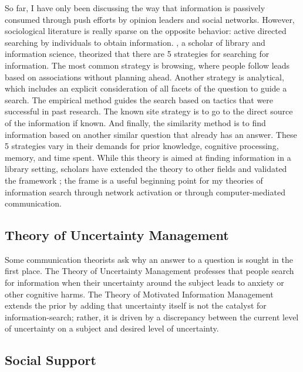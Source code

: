 So far, I have only been discussing the way that information is
passively consumed through push efforts by opinion leaders and social
networks. However, sociological literature is really sparse on the
opposite behavior: active directed searching by individuals to obtain
information. \citep{pejtersenDesignComputeraidedUsersystem1984}, a scholar of library and information
science, theorized that there are 5 strategies for searching for
information. The most common strategy is browsing, where people follow
leads based on associations without planning ahead. Another strategy is
analytical, which includes an explicit consideration of all facets of
the question to guide a search. The empirical method guides the search
based on tactics that were successful in past research. The known site
strategy is to go to the direct source of the information if known. And
finally, the similarity method is to find information based on another
similar question that already has an answer. These 5 strategies vary in
their demands for prior knowledge, cognitive processing, memory, and
time spent. While this theory is aimed at finding information in a
library setting, scholars have extended the theory to other fields and
validated the framework \citep{fidelHumanInformationInteraction2012}; the frame is a useful beginning
point for my theories of information search through network activation
or through computer-mediated communication.

\subsection{Theory of Uncertainty Management}

Some communication theorists ask why an answer to a question is sought
in the first place. The Theory of Uncertainty Management \citep{brashersCommunicationUncertaintyManagement2001}
professes that people search for information when their uncertainty
around the subject leads to anxiety or other cognitive harms. The Theory
of Motivated Information Management \citep{afifiSeekingInformationSexual2006, afifiTheoryMotivatedInformation2004}
extends the prior by adding that uncertainty itself is not the catalyst
for information-search; rather, it is driven by a discrepancy between
the current level of uncertainty on a subject and desired level of
uncertainty.

\subsection{Social Support}

